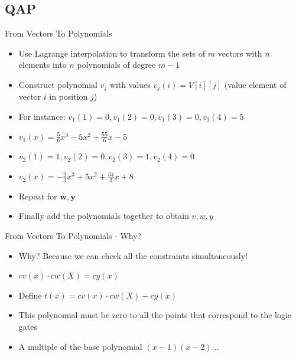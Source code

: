 \documentclass[handout]{beamer}
\begin{document}
\subsection{QAP}
\begin{frame}{From Vectors To Polynomials}
    \begin{itemize}
        \item Use Lagrange interpolation to transform the sets of $m$ vectors with $n$ elements into $n$ polynomials of degree $m-1$ \pause
        \item Construct polynomial $v_j$ with values $v_j(i) =V[i][j]$ (value element of vector $i$ in position $j$) \pause
        \item For instance: $v_1(1) = 0, v_1(2) = 0, v_1(3)=0, v_1(4) = 5$ \pause
        \item $v_1(x) = \frac{5}{6}x^3-5x^2+\frac{55}{6}x-5$ \pause
        \item $v_2(1) = 1, v_2(2) = 0, v_2(3)=1, v_2(4) = 0$ \pause
        \item $v_2(x) = -\frac{2}{3}x^3+5x^2+\frac{34}{3}x+8$ \pause
        \item Repeat for $\bm{w}, \bm{y}$ \pause
        \item Finally add the polynomials together to obtain $v,w,y$ \pause
    \end{itemize}
\end{frame}

\begin{frame}{From Vectors To Polynomials - Why?}
\begin{itemize}
    \item Why? Because we can check all the constraints simultaneously! \pause
    \item $cv(x) \cdot cw(X) = cy(x)$ \pause
    \item Define $t(x) = cv(x) \cdot cw(X) - cy(x)$ \pause
    \item This polynomial must be zero to all the points that correspond to the logic gates \pause
    \item A multiple of the base polynomial $(x-1)(x-2)...$
\end{itemize}
\end{frame}
\end{document}
